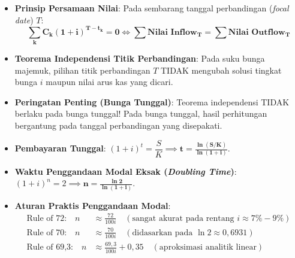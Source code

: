 \documentclass[10pt,a4paper]{article}
\begin{document}
\begin{rumusbox}
\begin{itemize}[leftmargin=1.5em, topsep=1.5pt, itemsep=2pt]
    \item \textbf{Prinsip Persamaan Nilai}: Pada sembarang tanggal perbandingan (\textit{focal date}) $T$:
    \begin{equation*}
        \mathbf{\sum_{k} C_k (1+i)^{T - t_k} = 0} \iff \mathbf{\sum \text{Nilai Inflow}_T = \sum \text{Nilai Outflow}_T}
    \end{equation*}
    \item \textbf{Teorema Independensi Titik Perbandingan}:
    Pada suku bunga majemuk, pilihan titik perbandingan $T$ TIDAK mengubah solusi tingkat bunga $i$ maupun nilai arus kas yang dicari.
    \item \textbf{Peringatan Penting (Bunga Tunggal)}: Teorema independensi TIDAK berlaku pada bunga tunggal! Pada bunga tunggal, hasil perhitungan bergantung pada tanggal perbandingan yang disepakati.
\end{itemize}
\end{rumusbox}

\begin{teoremabox}
\begin{itemize}[leftmargin=1.5em, topsep=1.5pt, itemsep=2pt]
    \item \textbf{Pembayaran Tunggal}: $(1+i)^t = \dfrac{S}{K} \implies \mathbf{t = \frac{\ln(S/K)}{\ln(1+i)}}$.
    \item \textbf{Waktu Penggandaan Modal Eksak (\textit{Doubling Time})}: $(1+i)^n = 2 \implies \mathbf{n = \frac{\ln 2}{\ln(1+i)}}$.
    \item \textbf{Aturan Praktis Penggandaan Modal}:
    \begin{align*}
        \text{Rule of 72:} \quad n &\approx \frac{72}{100i} \quad (\text{sangat akurat pada rentang } i \approx 7\% - 9\%) \\[0.2em]
        \text{Rule of 70:} \quad n &\approx \frac{70}{100i} \quad (\text{didasarkan pada } \ln 2 \approx 0{,}6931) \\[0.2em]
        \text{Rule of 69{,}3:} \quad n &\approx \frac{69{,}3}{100i} + 0{,}35 \quad (\text{aproksimasi analitik linear})
    \end{align*}
\end{itemize}
\end{teoremabox}
\end{document}
